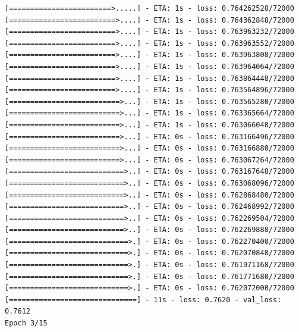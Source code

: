 \documentclass[12pt,fleqn]{article}\usepackage{../../common}
\begin{document}
\begin{verbatim}
[========================>.....] - ETA: 1s - loss: 0.764262528/72000 [=========================>....] - ETA: 1s - loss: 0.764362848/72000 [=========================>....] - ETA: 1s - loss: 0.763963232/72000 [=========================>....] - ETA: 1s - loss: 0.763963552/72000 [=========================>....] - ETA: 1s - loss: 0.763963808/72000 [=========================>....] - ETA: 1s - loss: 0.763964064/72000 [=========================>....] - ETA: 1s - loss: 0.763864448/72000 [=========================>....] - ETA: 1s - loss: 0.763564896/72000 [==========================>...] - ETA: 1s - loss: 0.763565280/72000 [==========================>...] - ETA: 1s - loss: 0.763365664/72000 [==========================>...] - ETA: 1s - loss: 0.763066048/72000 [==========================>...] - ETA: 0s - loss: 0.763166496/72000 [==========================>...] - ETA: 0s - loss: 0.763166880/72000 [==========================>...] - ETA: 0s - loss: 0.763067264/72000 [===========================>..] - ETA: 0s - loss: 0.763167648/72000 [===========================>..] - ETA: 0s - loss: 0.763068096/72000 [===========================>..] - ETA: 0s - loss: 0.762868480/72000 [===========================>..] - ETA: 0s - loss: 0.762468992/72000 [===========================>..] - ETA: 0s - loss: 0.762269504/72000 [===========================>..] - ETA: 0s - loss: 0.762269888/72000 [============================>.] - ETA: 0s - loss: 0.762270400/72000 [============================>.] - ETA: 0s - loss: 0.762070848/72000 [============================>.] - ETA: 0s - loss: 0.761971168/72000 [============================>.] - ETA: 0s - loss: 0.761771680/72000 [============================>.] - ETA: 0s - loss: 0.762072000/72000 [==============================] - 11s - loss: 0.7620 - val_loss: 0.7612
Epoch 3/15

\end{verbatim}
\end{document}
